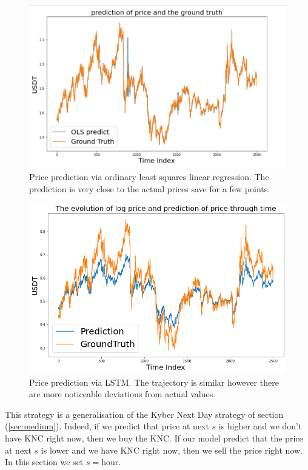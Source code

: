 \documentclass[twoside]{report}
\begin{document}
\begin{spacing}{1}
\begin{figure}[!htbp]
    \centering
    \includegraphics[scale = 0.65]{Images/OLS price prediction.png}
    \caption{Price prediction via ordinary least squares linear regression. The prediction is very close to the actual prices save for a few points.}
    \label{fig:OLS price}
\end{figure}

\begin{figure}[!htbp]
    \centering
    \includegraphics[scale = 0.5]{Images/LSTM price.png}
    \caption{Price prediction via LSTM. The trajectory is similar however there are more noticeable deviations from actual values.}
    \label{fig:LSTM price}
\end{figure}

\begin{strategy}
This strategy is a generalisation of the Kyber Next Day strategy of section (\ref{sec:medium}). Indeed, if we predict that price at next $s$ is higher and we don't have KNC right now, then we buy the KNC. If our model predict that the price at next $s$ is lower and we have KNC right now, then we sell the price right now. In this section we set $s = \text{hour}$.
\end{strategy}


\end{spacing}
\end{document}
